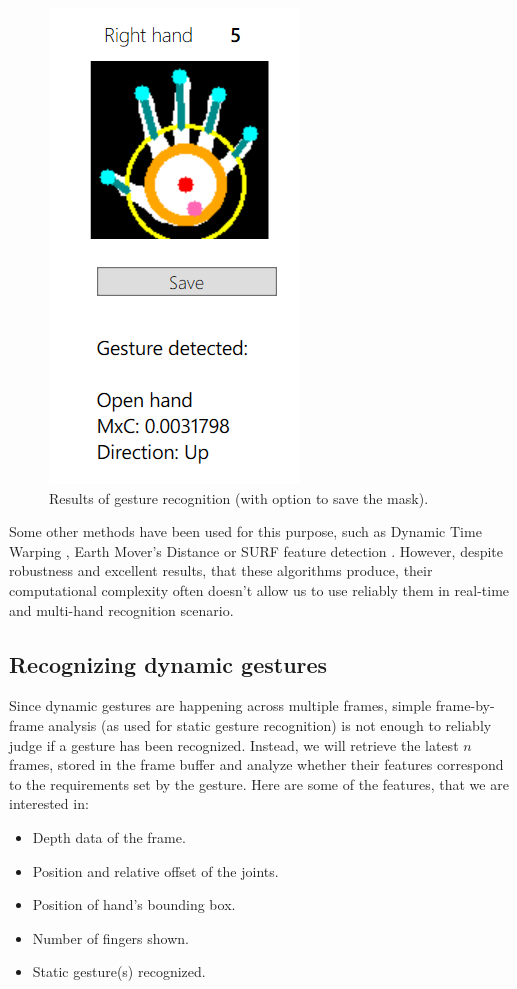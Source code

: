 \documentclass[a4paper,11pt,oneside]{article}
\begin{document}
\begin{figure}[H]
\centering
\includegraphics[scale=1]{hand-control.png}
\caption{Results of gesture recognition (with option to save the mask).}
\end{figure}

Some other methods have been used for this purpose, such as Dynamic Time Warping \cite{DR01}, Earth Mover's Distance \cite{ZH01} or SURF feature detection \cite{HB01}.  However, despite robustness and excellent results, that these algorithms produce, their computational complexity often doesn't allow us to use reliably them in real-time and multi-hand recognition scenario.

\subsection{Recognizing dynamic gestures}

Since dynamic gestures are happening across multiple frames, simple frame-by-frame analysis (as used for static gesture recognition) is not enough to reliably judge if a gesture has been recognized. Instead, we will retrieve the latest $n$ frames, stored in the frame buffer and analyze whether their features correspond to the requirements set by the gesture. Here are some of the features, that we are interested in:

\begin{itemize}
\item Depth data of the frame.
\item Position and relative offset of the joints.
\item Position of hand's bounding box.
\item Number of fingers shown.
\item Static gesture(s) recognized.
\end{itemize}
\end{document}
